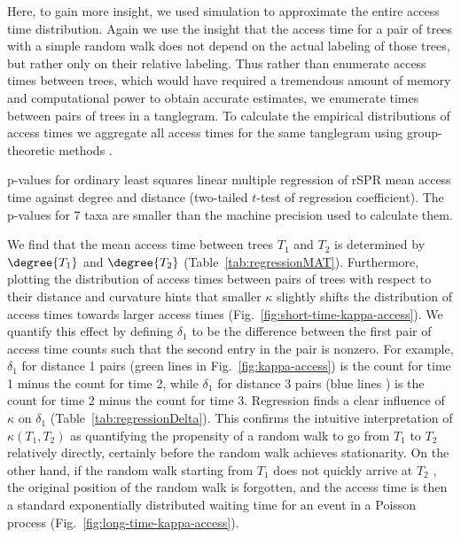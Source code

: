 \documentclass[11pt]{amsart}
\let\MYoriglatexcaption\caption
\renewcommand{\caption}[2][\relax]{\MYoriglatexcaption[#2]{#2}}
\newcommand{\cuttable}[2][]{%
    \ifthenelse{\equal{#1}{}}%
		{}%
		{#1}%
}
\begin{document}
Here, to gain more insight, we used simulation to approximate the entire access time distribution.
Again we use the insight that the access time for a pair of trees with a simple random walk does not depend on the actual labeling of those trees, but rather only on their relative labeling.
Thus rather than enumerate access times between trees, which would have required a tremendous amount of memory and computational power to obtain accurate estimates, we enumerate times between pairs of trees in a tanglegram.
To calculate the empirical distributions of access times we aggregate all access times for the same tanglegram using \cuttable{our }group-theoretic methods \cite{tangle}.

\begin{table}
\centering
\caption{p-values for ordinary least squares linear multiple regression of rSPR mean access time against degree and distance (two-tailed $t$-test of regression coefficient). The p-values for 7 taxa are smaller than the machine precision used to calculate them.}
\label{tab:regressionMAT}
\end{table}

We find that the mean access time between trees $T_1$ and $T_2$ is determined by $\degree{T_1}$ and $\degree{T_2}$ (Table~\ref{tab:regressionMAT}).
Furthermore, plotting the distribution of access times between pairs of trees with respect to their distance and curvature hints that smaller $\kappa$ slightly shifts the distribution of access times towards larger access times (Fig.~\ref{fig:short-time-kappa-access}).
We quantify this effect by defining $\delta_1$ to be the difference between the first pair of access time counts such that the second entry in the pair is nonzero.
For example, $\delta_1$ for distance 1 pairs (green lines in Fig.~\ref{fig:kappa-access}) is the count for time 1 minus the count for time 2, while $\delta_1$ for distance 3 pairs (blue lines\cuttable{ in Fig.~\ref{fig:kappa-access}}) is the count for time 2 minus the count for time 3.
Regression finds a clear influence of $\kappa$ on $\delta_1$ (Table~\ref{tab:regressionDelta}).
This confirms the intuitive interpretation of $\kappa(T_1, T_2)$ as quantifying the propensity of a random walk to go from $T_1$ to $T_2$ relatively directly, certainly before the random walk achieves stationarity.
On the other hand, if the random walk starting from $T_1$ does not quickly arrive at $T_2$\cuttable{ and instead achieves stationarity}, the original position of the random walk is forgotten, and the access time is then a standard exponentially distributed waiting time for an event in a Poisson process (Fig.~\ref{fig:long-time-kappa-access}).
\end{document}
